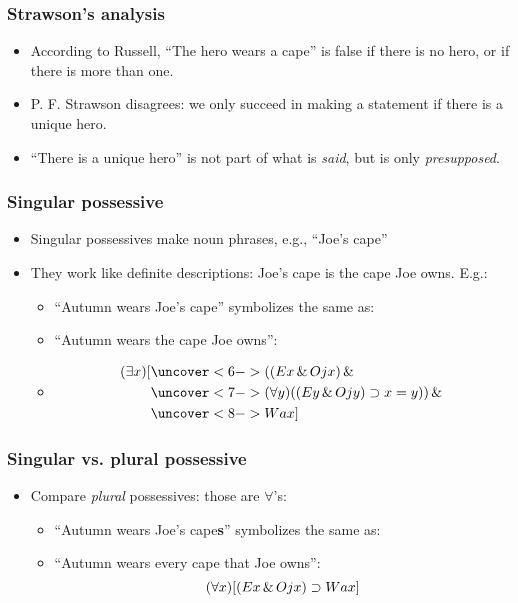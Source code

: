 \begin{frame}
    \frametitle{Strawson's analysis}

\begin{itemize}
\item According to Russell, ``The hero wears a cape'' is false if there is no hero, or if there is more than one.
\item P. F. Strawson disagrees: we only succeed in making a statement
if there is a unique hero.
\item ``There is a unique hero'' is not part of what is \emph{said}, but is only \emph{presupposed}.
\end{itemize}
\end{frame}

\begin{frame}
  \frametitle{Singular possessive}

  \begin{itemize}[<+->]
    \item Singular possessives make noun phrases, e.g., ``Joe's cape''
    \item They work like definite descriptions: Joe's cape is the cape Joe owns.
    E.g.:
    \begin{itemize}
      \item ``Autumn wears \alert{Joe's cape}'' symbolizes the same as:
      \item[] ``Autumn wears \alert{the cape Joe owns}'':
      \item[]
      \begin{align*}
        \qt{\exists}{x}[& \uncover<6->{((E\qv{x} \land O\qr{j}{x}) \land {}}\\
        & \uncover<7->{\qt{\forall}{y}((E\qv{y} \land O\qr{j}{y}) \eif x=y)) \land {}}\\
        & \uncover<8->{W\qr{a}{x}]}
      \end{align*}
    \end{itemize}
  \end{itemize}
\end{frame}

\begin{frame}
  \frametitle{Singular vs. plural possessive}

  \begin{itemize}[<+->]
    \item Compare \emph{plural} possessives: those are $\forall$'s:
    \begin{itemize}[<+->]
      \item ``Autumn wears \alert{Joe's cape\textbf{s}}'' symbolizes the same
      as:
      \item[] ``Autumn wears every cape that Joe owns'':
      \[(\forall x)[(Ex \,\&\, Ojx) \supset Wax]\]
    \end{itemize}
  \end{itemize}
\end{frame}

